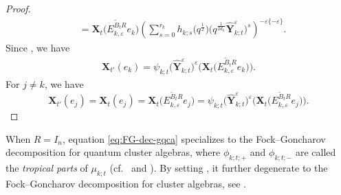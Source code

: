 \documentclass[11pt]{article}
\numberwithin{equation}{section}
\numberwithin{equation}{section}
\begin{document}
\begin{proof}
\begin{align*}
 &=\mathbf{X}_{t}\bigl(E^{\tilde{B}_{t}R}_{k,\varepsilon}e_{k}\bigr)\left(\sum\limits^{r_{k}}_{s=0}h_{k;s}\bigl(q^{\frac{1}{2}}\bigr)\bigl(q^{\frac{1}{2d_{k}}}\mathbf{\hat{Y}}_{k;t}^{\varepsilon}\bigr)^{s}\right)^{-\varepsilon\{-\varepsilon\}}.
 \end{align*}
 Since , we have
 \begin{align*}
 \mathbf{X}_{t'}(e_{k})=\psi_{k;t}\bigl(\mathbf{\hat{Y}}_{k;t}^{\varepsilon}\bigr)^{\varepsilon}\bigl(\mathbf{X}_{t}\bigl(E^{\tilde{B}_{t}R}_{k,\varepsilon}e_{k}\bigr)\bigr).
 \end{align*}
 For $j\neq k$, we have
 \[
 \mathbf{X}_{t'}(e_{j})
 =\mathbf{X}_{t}(e_{j})
 =\mathbf{X}_{t}\bigl(E^{\tilde{B}_{t}R}_{k,\varepsilon}e_{j}\bigr)
 =\psi_{k;t}\bigl(\mathbf{\hat{Y}}_{k;t}^{\varepsilon}\bigr)^{\varepsilon}\bigl(\mathbf{X}_{t}\bigl(E^{\tilde{B}_{t}R}_{k,\varepsilon}e_{j}\bigr)\bigr).\tag*{\qed}
 \]\renewcommand{\qed}{}
\end{proof}

\begin{Remark}
When $R=I_n$, equation \eqref{eq:FG-dec-gqca} specializes to the Fock--Goncharov decomposition for quantum cluster algebras, where $\phi_{k;t;+}$ and $\phi_{k;t;-}$ are called the {\it tropical parts} of $\mu_{k;t}$ (cf.\ \cite[Section 3.3]{fock2009} and \cite[Section 6.3]{Keller2012}). By setting , it further degenerate to the Fock--Goncharov decomposition for cluster algebras, see \cite[Section 2.3]{LMN2023}.
\end{Remark}
\end{document}
